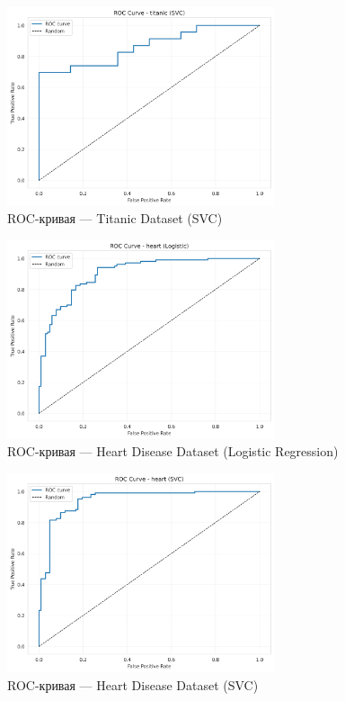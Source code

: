 \documentclass[a4paper]{article}
\begin{document}
\begin{figure}[H]
\centering
\includegraphics[width=0.7\textwidth]{images/roc_curve_titanic_svc.png}
\caption{ROC-кривая — Titanic Dataset (SVC)}
\end{figure}

\begin{figure}[H]
\centering
\includegraphics[width=0.7\textwidth]{images/roc_curve_heart_logistic.png}
\caption{ROC-кривая — Heart Disease Dataset (Logistic Regression)}
\end{figure}

\begin{figure}[H]
\centering
\includegraphics[width=0.7\textwidth]{images/roc_curve_heart_svc.png}
\caption{ROC-кривая — Heart Disease Dataset (SVC)}
\end{figure}
\end{document}
